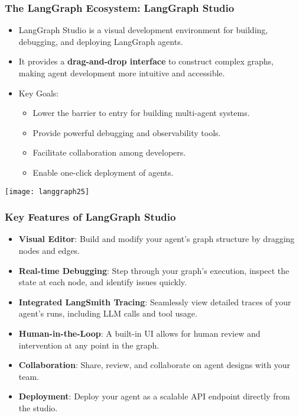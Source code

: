 \begin{frame}[fragile]\frametitle{The LangGraph Ecosystem: LangGraph Studio}
      \begin{itemize}
        \item LangGraph Studio is a visual development environment for building, debugging, and deploying LangGraph agents.
        \item It provides a \textbf{drag-and-drop interface} to construct complex graphs, making agent development more intuitive and accessible.
        \item Key Goals:
        \begin{itemize}
            \item Lower the barrier to entry for building multi-agent systems.
            \item Provide powerful debugging and observability tools.
            \item Facilitate collaboration among developers.
            \item Enable one-click deployment of agents.
        \end{itemize}
      \end{itemize}
\begin{center}
    \texttt{[image: langgraph25]}
\end{center}
\end{frame}

\begin{frame}[fragile]\frametitle{Key Features of LangGraph Studio}
      \begin{itemize}
        \item \textbf{Visual Editor}: Build and modify your agent's graph structure by dragging nodes and edges.
        \item \textbf{Real-time Debugging}: Step through your graph's execution, inspect the state at each node, and identify issues quickly.
        \item \textbf{Integrated LangSmith Tracing}: Seamlessly view detailed traces of your agent's runs, including LLM calls and tool usage.
        \item \textbf{Human-in-the-Loop}: A built-in UI allows for human review and intervention at any point in the graph.
        \item \textbf{Collaboration}: Share, review, and collaborate on agent designs with your team.
        \item \textbf{Deployment}: Deploy your agent as a scalable API endpoint directly from the studio.
      \end{itemize}
\end{frame}

